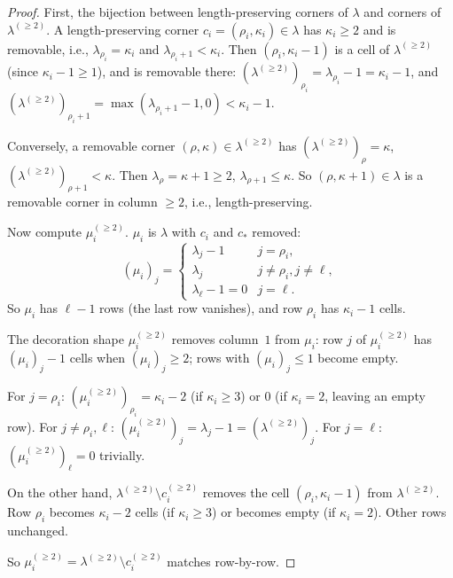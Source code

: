 \documentclass[11pt]{article}
\theoremstyle{definition}
\begin{document}
\begin{proof}
First, the bijection between length-preserving corners of $\lambda$
and corners of $\lambda^{(\ge 2)}$. A length-preserving corner
$c_i = (\rho_i, \kappa_i) \in \lambda$ has $\kappa_i \ge 2$ and is
removable, i.e., $\lambda_{\rho_i} = \kappa_i$ and $\lambda_{\rho_i + 1}
< \kappa_i$. Then $(\rho_i, \kappa_i - 1)$ is a cell of
$\lambda^{(\ge 2)}$ (since $\kappa_i - 1 \ge 1$), and is removable
there: $(\lambda^{(\ge 2)})_{\rho_i} = \lambda_{\rho_i} - 1 = \kappa_i - 1$,
and $(\lambda^{(\ge 2)})_{\rho_i + 1} = \max(\lambda_{\rho_i + 1} - 1, 0)
< \kappa_i - 1$.

Conversely, a removable corner $(\rho, \kappa) \in \lambda^{(\ge 2)}$
has $(\lambda^{(\ge 2)})_\rho = \kappa$, $(\lambda^{(\ge 2)})_{\rho+1}
< \kappa$. Then $\lambda_\rho = \kappa + 1 \ge 2$, $\lambda_{\rho+1}
\le \kappa$. So $(\rho, \kappa + 1) \in \lambda$ is a removable corner
in column $\ge 2$, i.e., length-preserving.

Now compute $\mu_i^{(\ge 2)}$. $\mu_i$ is $\lambda$ with $c_i$ and
$c_*$ removed:
\[
   (\mu_i)_j = \begin{cases}
      \lambda_j - 1 & j = \rho_i, \\
      \lambda_j & j \ne \rho_i, j \ne \ell, \\
      \lambda_\ell - 1 = 0 & j = \ell.
   \end{cases}
\]
So $\mu_i$ has $\ell - 1$ rows (the last row vanishes), and row
$\rho_i$ has $\kappa_i - 1$ cells.

The decoration shape $\mu_i^{(\ge 2)}$ removes column~$1$ from
$\mu_i$: row $j$ of $\mu_i^{(\ge 2)}$ has $(\mu_i)_j - 1$ cells
when $(\mu_i)_j \ge 2$; rows with $(\mu_i)_j \le 1$ become empty.

For $j = \rho_i$: $(\mu_i^{(\ge 2)})_{\rho_i} = \kappa_i - 2$ (if
$\kappa_i \ge 3$) or 0 (if $\kappa_i = 2$, leaving an empty row).
For $j \ne \rho_i, \ell$: $(\mu_i^{(\ge 2)})_j = \lambda_j - 1
= (\lambda^{(\ge 2)})_j$. For $j = \ell$: $(\mu_i^{(\ge 2)})_\ell = 0$
trivially.

On the other hand, $\lambda^{(\ge 2)} \setminus c_i^{(\ge 2)}$ removes
the cell $(\rho_i, \kappa_i - 1)$ from $\lambda^{(\ge 2)}$. Row
$\rho_i$ becomes $\kappa_i - 2$ cells (if $\kappa_i \ge 3$) or
becomes empty (if $\kappa_i = 2$). Other rows unchanged.

So $\mu_i^{(\ge 2)} = \lambda^{(\ge 2)} \setminus c_i^{(\ge 2)}$
matches row-by-row.
\end{proof}
\end{document}
